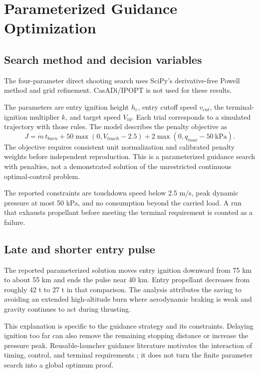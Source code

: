 \documentclass[11pt,a4paper]{article}
\begin{document}
\section{Parameterized Guidance Optimization}
\subsection{Search method and decision variables}
The four-parameter direct shooting search uses SciPy's derivative-free Powell method and grid refinement. CasADi/IPOPT is not used for these results.



The parameters are entry ignition height $h_e$, entry cutoff speed $v_{cut}$, the terminal-ignition multiplier $k$, and target speed $V_{td}$. Each trial corresponds to a simulated trajectory with those rules. The model describes the penalty objective as
\begin{equation}
 J=\dot m\,t_{burn}
 +50\max(0,V_{touch}-2.5)
 +2\max(0,q_{max}-50\ \mathrm{kPa}).
\label{eq:objective}
\end{equation}
The objective requires consistent unit normalization and calibrated penalty weights before independent reproduction. This is a parameterized guidance search with penalties, not a demonstrated solution of the unrestricted continuous optimal-control problem.

The reported constraints are touchdown speed below 2.5 m/s, peak dynamic pressure at most 50 kPa, and no consumption beyond the carried load. A run that exhausts propellant before meeting the terminal requirement is counted as a failure.

\subsection{Late and shorter entry pulse}


The reported parameterized solution moves entry ignition downward from 75 km to about 55 km and ends the pulse near 40 km. Entry propellant decreases from roughly 42 t to 27 t in that comparison. The analysis attributes the saving to avoiding an extended high-altitude burn where aerodynamic braking is weak and gravity continues to act during thrusting.

This explanation is specific to the guidance strategy and its constraints. Delaying ignition too far can also remove the remaining stopping distance or increase the pressure peak. Reusable-launcher guidance literature motivates the interaction of timing, control, and terminal requirements \cite{wilken,simplicio,botelho}; it does not turn the finite parameter search into a global optimum proof.
\end{document}
